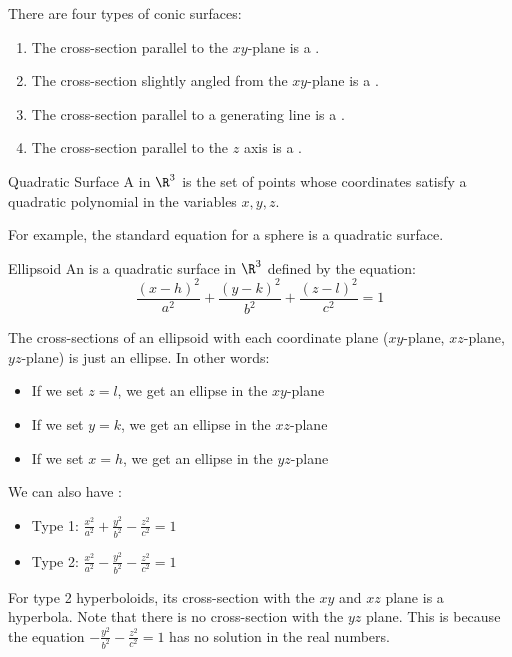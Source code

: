 \documentclass[12pt]{report}
\begin{document}
There are four types of conic surfaces:
\begin{enumerate}[noitemsep]
    \item The cross-section parallel to the $xy$-plane is a .
    \item The cross-section slightly angled from the $xy$-plane is a .
    \item The cross-section parallel to a generating line is a .
    \item The cross-section parallel to the $z$ axis is a .
\end{enumerate}

\begin{dfnbox}{Quadratic Surface}{}
    A  in $\R^3$ is the set of points whose coordinates satisfy a quadratic polynomial in the variables $x,y,z$.
\end{dfnbox}

For example, the standard equation for a sphere is a quadratic surface.

\begin{dfnbox}{Ellipsoid}{}
    An  is a quadratic surface in $\R^3$ defined by the equation:
    \[ \frac{(x-h)^2}{a^2} + \frac{(y-k)^2}{b^2} + \frac{(z-l)^2}{c^2} = 1 \]
\end{dfnbox}

The cross-sections of an ellipsoid with each coordinate plane ($xy$-plane, $xz$-plane, $yz$-plane) is just an ellipse. In other words:
\begin{itemize}[noitemsep]
    \item If we set $z = l$, we get an ellipse in the $xy$-plane
    \item If we set $y = k$, we get an ellipse in the $xz$-plane
    \item If we set $x = h$, we get an ellipse in the $yz$-plane
\end{itemize}

We can also have :
\begin{itemize}
    \item Type 1: $\frac{x^2}{a^2} + \frac{y^2}{b^2} - \frac{z^2}{c^2} = 1$
    \item Type 2: $\frac{x^2}{a^2} - \frac{y^2}{b^2} - \frac{z^2}{c^2} = 1$
\end{itemize}

For type 2 hyperboloids, its cross-section with the $xy$ and $xz$ plane is a hyperbola. Note that there is no cross-section with the $yz$ plane. This is because the equation $- \frac{y^2}{b^2} - \frac{z^2}{c^2} = 1$ has no solution in the real numbers.
\end{document}
